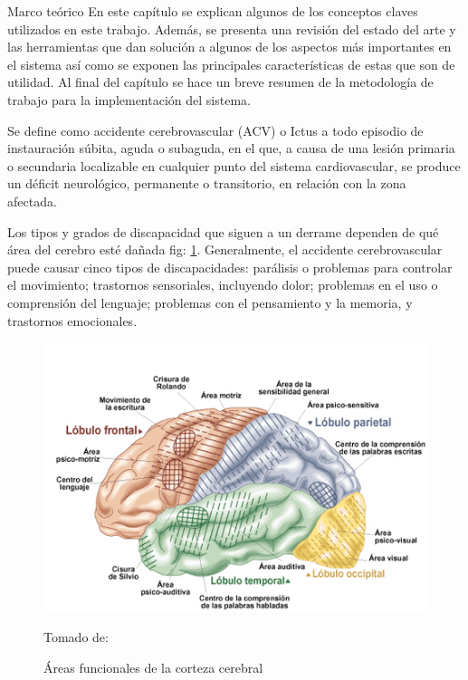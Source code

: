 \begin{thesischapter}{1} {Marco teórico}
    En este capítulo se explican algunos de los conceptos claves utilizados en este trabajo. Además, se presenta una revisión del estado del arte y las herramientas que dan solución a algunos de los aspectos más importantes en el sistema así como se exponen las principales características de estas que son de utilidad. Al final del capítulo se hace un breve resumen de la metodología de trabajo para la implementación del sistema.

    
    \vspace{10pt}
    Se define como accidente cerebrovascular (ACV) o Ictus a todo episodio de instauración súbita, aguda o subaguda, en el que, a causa de una lesión primaria o secundaria localizable en cualquier punto del sistema cardiovascular, se produce un déficit neurológico, permanente o transitorio, en relación con la zona afectada.~\cite{ictus}

    \vspace{10pt}
    Los tipos y grados de discapacidad que siguen a un derrame dependen de qué área del cerebro esté dañada fig: \ref{fig: cerebralcortex}. Generalmente, el accidente cerebrovascular puede causar cinco tipos de discapacidades: parálisis o problemas para controlar el movimiento; trastornos sensoriales, incluyendo dolor; problemas en el uso o comprensión del lenguaje; problemas con el pensamiento y la memoria, y trastornos emocionales.~\cite{post-strok}

    \begin{figure}[ht]
        \centering
        \includegraphics[scale=0.5]{images/brain.jpg}
        \caption{Áreas funcionales de la corteza cerebral}
        Tomado de: ~\cite{areacereabral}
        \label{fig: cerebralcortex}
    \end{figure}


\end{thesischapter}
